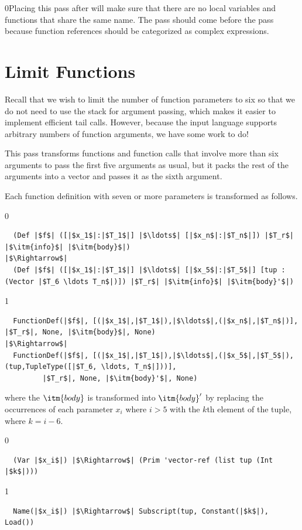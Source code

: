 \documentclass[7x10,nocrop]{TimesAPriori_MIT}%
\def\racketEd{0}
\def\pythonEd{1}
\def\edition{0}
\newcommand{\racket}[1]{{\if\edition\racketEd{#1}\fi}}
\begin{document}

\racket{Placing this pass after  will make sure that
  there are no local variables and functions that share the same
  name.}
%
The  pass should come before the
 pass because function references
should be categorized as complex expressions.

\section{Limit Functions}
\label{sec:limit-functions-r4}

Recall that we wish to limit the number of function parameters to six
so that we do not need to use the stack for argument passing, which
makes it easier to implement efficient tail calls.  However, because
the input language \LangFun{} supports arbitrary numbers of function
arguments, we have some work to do!

This pass transforms functions and function calls that involve more
than six arguments to pass the first five arguments as usual, but it
packs the rest of the arguments into a vector and passes it as the
sixth argument.

Each function definition with seven or more parameters is transformed as
follows.
{\if\edition\racketEd   
\begin{lstlisting}
  (Def |$f$| ([|$x_1$|:|$T_1$|] |$\ldots$| [|$x_n$|:|$T_n$|]) |$T_r$| |$\itm{info}$| |$\itm{body}$|) 
|$\Rightarrow$|
  (Def |$f$| ([|$x_1$|:|$T_1$|] |$\ldots$| [|$x_5$|:|$T_5$|] [tup : (Vector |$T_6 \ldots T_n$|)]) |$T_r$| |$\itm{info}$| |$\itm{body}'$|) 
\end{lstlisting}
\fi}
{\if\edition\pythonEd   
\begin{lstlisting}
  FunctionDef(|$f$|, [(|$x_1$|,|$T_1$|),|$\ldots$|,(|$x_n$|,|$T_n$|)], |$T_r$|, None, |$\itm{body}$|, None)
|$\Rightarrow$|
  FunctionDef(|$f$|, [(|$x_1$|,|$T_1$|),|$\ldots$|,(|$x_5$|,|$T_5$|),(tup,TupleType([|$T_6, \ldots, T_n$|]))],
         |$T_r$|, None, |$\itm{body}'$|, None)
\end{lstlisting}
\fi}
%
\noindent where the $\itm{body}$ is transformed into $\itm{body}'$ by
replacing the occurrences of each parameter $x_i$ where $i > 5$ with
the $k$th element of the tuple, where $k = i - 6$.
%
{\if\edition\racketEd
\begin{lstlisting}
  (Var |$x_i$|) |$\Rightarrow$| (Prim 'vector-ref (list tup (Int |$k$|)))
\end{lstlisting}
\fi}
{\if\edition\pythonEd   
\begin{lstlisting}
  Name(|$x_i$|) |$\Rightarrow$| Subscript(tup, Constant(|$k$|), Load())
\end{lstlisting}
\fi}
\end{document}
